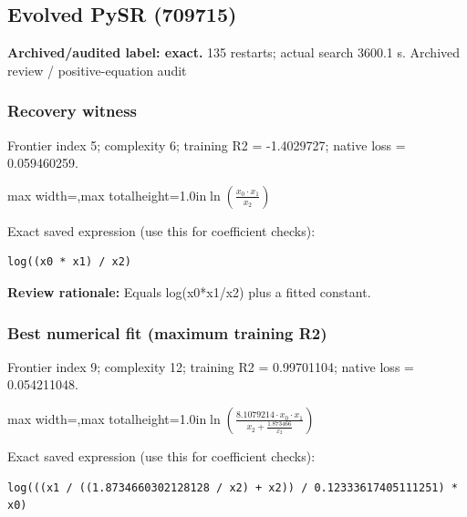 \documentclass[10pt,letterpaper,landscape]{article}
\begin{document}
\begin{minipage}[t]{0.485\textwidth}
\subsection*{Evolved PySR (709715)}
\textbf{Archived/audited label: exact.} 135 restarts; actual search 3600.1 s.
{\small Archived review / positive-equation audit}
\subsubsection*{Recovery witness}
Frontier index 5; complexity 6; training R2 = -1.4029727; native loss = 0.059460259.
\begin{center}\begin{adjustbox}{max width=\linewidth,max totalheight=1.0in}$\displaystyle \ln{\left(\frac{x_{0} \cdot x_{1}}{x_{2}} \right)}$\end{adjustbox}\end{center}
{\scriptsize Exact saved expression (use this for coefficient checks):}
\begin{lstlisting}
log((x0 * x1) / x2)
\end{lstlisting}
{\small\textbf{Review rationale:} Equals log(x0*x1/x2) plus a fitted constant.}
\subsubsection*{Best numerical fit (maximum training R2)}
Frontier index 9; complexity 12; training R2 = 0.99701104; native loss = 0.054211048.
\begin{center}\begin{adjustbox}{max width=\linewidth,max totalheight=1.0in}$\displaystyle \ln{\left(\frac{8.1079214 \cdot x_{0} \cdot x_{1}}{x_{2} + \frac{1.873466}{x_{2}}} \right)}$\end{adjustbox}\end{center}
{\scriptsize Exact saved expression (use this for coefficient checks):}
\begin{lstlisting}
log(((x1 / ((1.8734660302128128 / x2) + x2)) / 0.12333617405111251) * x0)
\end{lstlisting}
\end{minipage}
\clearpage{}\label{ideal_gas-10004}
\end{document}
